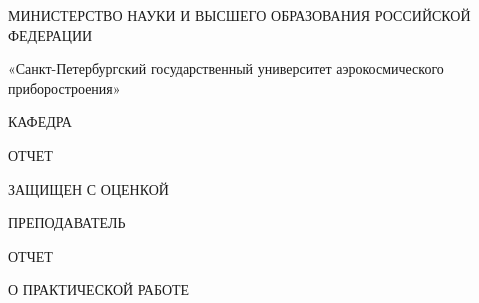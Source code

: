 

\thispagestyle{empty}

\begingroup
\fontsize{12}{14.4}\selectfont


\begin{center}
МИНИСТЕРСТВО НАУКИ И ВЫСШЕГО ОБРАЗОВАНИЯ РОССИЙСКОЙ ФЕДЕРАЦИИ
	
\vspace{0.5ex}
	
	
«Санкт-Петербургский государственный университет аэрокосмического приборостроения»
	
\vspace{0.9cm}
	
КАФЕДРА \MakeUppercase{\setUniversityDepartment}
\end{center} 

\vspace{1.2cm}

\begin{flushleft}
ОТЧЕТ
	
ЗАЩИЩЕН С ОЦЕНКОЙ
	
ПРЕПОДАВАТЕЛЬ
\end{flushleft}

\noindent {}

\vspace{1.2cm}

\begin{center}
{\fontsize{14}{18}\selectfont
ОТЧЕТ
		
О ПРАКТИЧЕСКОЙ РАБОТЕ \setWorkNumber
}
	
\vspace{12mm}
	
{\fontsize{14}{18}\selectfont \MakeUppercase{\setWorkName}}
\end{center}

